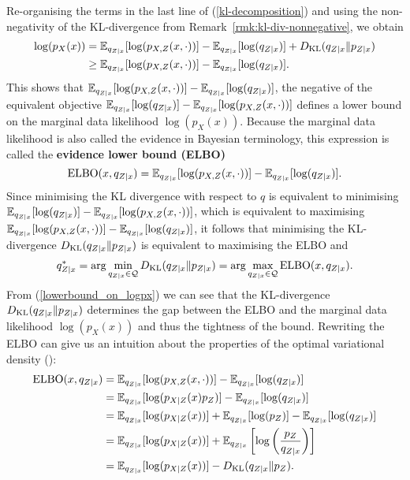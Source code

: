 Re-organising the terms in the last line of (\ref{kl-decomposition}) and using the non-negativity of the KL-divergence from Remark~\ref{rmk:kl-div-nonnegative}, we obtain
\begin{equation}\label{lowerbound_on_logpx}
\begin{split}
	\log(p_{X}(x)) &= \mathbb{E}_{q_{Z\mid x}}[\log(p_{X,Z}(x, \cdot))] - \mathbb{E}_{q_{Z\mid x}}[\log(q_{Z\mid x})] + D_{\mathrm{KL}}(q_{Z\mid x}\Vert p_{Z\mid x})\\
	&\geq \mathbb{E}_{q_{Z\mid x}}[\log(p_{X,Z}(x, \cdot))] - \mathbb{E}_{q_{Z\mid x}}[\log(q_{Z\mid x})].
\end{split}
\end{equation}
This shows that $\mathbb{E}_{q_{Z\mid x}}[\log(p_{X,Z}(x, \cdot))] - \mathbb{E}_{q_{Z\mid x}}[\log(q_{Z\mid x})]$, the negative of the equivalent objective $\mathbb{E}_{q_{Z\mid x}}[\log(q_{Z\mid x})] - \mathbb{E}_{q_{Z\mid x}}[\log(p_{X,Z}(x, \cdot))]$ defines a lower bound on the marginal data likelihood $\log(p_{X}(x))$. Because the marginal data likelihood is also called the evidence in Bayesian terminology, this expression is called the \textbf{evidence lower bound (ELBO)}
$$
\mathrm{ELBO}(x, q_{Z\mid x}) = \mathbb{E}_{q_{Z\mid x}}[\log(p_{X,Z}(x, \cdot))] - \mathbb{E}_{q_{Z\mid x}}[\log(q_{Z\mid x})].
$$
Since minimising the KL divergence with respect to $q$ is equivalent to minimising $\mathbb{E}_{q_{Z\mid x}}[\log(q_{Z\mid x})] - \mathbb{E}_{q_{Z\mid x}}[\log(p_{X,Z}(x, \cdot))]$, which is equivalent to maximising \\
$\mathbb{E}_{q_{Z\mid x}}[\log(p_{X,Z}(x, \cdot))] - \mathbb{E}_{q_{Z\mid x}}[\log(q_{Z\mid x})]$, it follows that minimising the KL-divergence $D_{\mathrm{KL}}(q_{Z\mid x}\Vert p_{Z\mid x})$ is equivalent to maximising the ELBO and 
$$
q_{Z\mid x}^* = \arg \min_{q_{Z\mid x}\in\mathcal{Q}} D_{\mathrm{KL}}(q_{Z\mid x}\Vert p_{Z\mid x}) = \arg \max_{q_{Z\mid x}\in\mathcal{Q}} \mathrm{ELBO}(x, q_{Z\mid x}).
$$
From (\ref{lowerbound_on_logpx}) we can see that the KL-divergence $D_{\mathrm{KL}}(q_{Z\mid x}\Vert p_{Z\mid x})$ determines the gap between the ELBO and the marginal data likelihood $\log(p_{X}(x))$ and thus the tightness of the bound. Rewriting the ELBO can give us an intuition about the properties of the optimal variational density (\cite[pp.~6f.]{Blei}):
\begin{equation}\label{elbo_form_recerror_kldivtoprior}
	\begin{split}
		\mathrm{ELBO}(x, q_{Z\mid x}) &= \mathbb{E}_{q_{Z\mid x}}[\log(p_{X,Z}(x, \cdot))] - \mathbb{E}_{q_{Z\mid x}}[\log(q_{Z\mid x})] \\
		&= \mathbb{E}_{q_{Z\mid x}}[\log(p_{X\mid Z}(x) p_Z)] - \mathbb{E}_{q_{Z\mid x}}[\log(q_{Z\mid x})] \\
		&= \mathbb{E}_{q_{Z\mid x}}[\log(p_{X\mid Z}(x))] + \mathbb{E}_{q_{Z\mid x}}[\log(p_{Z})] - \mathbb{E}_{q_{Z\mid x}}[\log(q_{Z\mid x})] \\
		&= \mathbb{E}_{q_{Z\mid x}}[\log(p_{X\mid Z}(x))] + \mathbb{E}_{q_{Z\mid x}}\left[\log\left(\frac{p_{Z}}{q_{Z\mid x}}\right)\right] \\
		&= \mathbb{E}_{q_{Z\mid x}}[\log(p_{X\mid Z}(x))] - D_{\mathrm{KL}}(q_{Z\mid x}\Vert p_{Z}).
	\end{split}
\end{equation}

